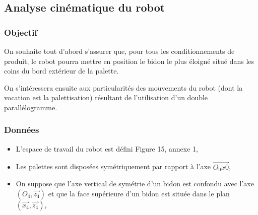 \subsection{Analyse cinématique du robot}

\subsubsection{Objectif}

On souhaite tout d'abord s'assurer que, pour tous les conditionnements de produit, le robot pourra mettre en position le bidon le plus éloigné situé dans les coins du bord extérieur de la palette.

On s'intéressera ensuite aux particularités des mouvements du robot (dont la vocation est la palettisation) résultant de l'utilisation d'un double parallélogramme.


\subsubsection{Données}

\begin{itemize}
 \item L'espace de travail du robot est défini Figure 15, annexe 1,
 \item Les palettes sont disposées symétriquement par rapport à l'axe $\overrightarrow{O_0x0}$,
 \item On suppose que l'axe vertical de symétrie d'un bidon est confondu avec l'axe $(O_4,\overrightarrow{z_4})$ et que la face supérieure d'un bidon est située dans le plan $(\overrightarrow{x_4},\overrightarrow{z_4})$,
\end{itemize} 

